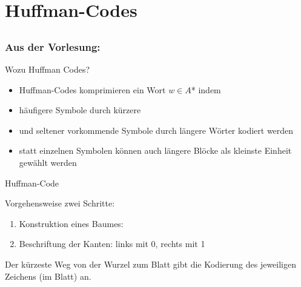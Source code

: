 \section{Huffman-Codes}
\subsection*{}
\begin{frame}
	\frametitle{Aus der Vorlesung:}
	\begin{block}{Wozu Huffman Codes?}
    		\begin{itemize}
              \item Huffman-Codes komprimieren ein Wort $w \in A$* indem \pause
              \item häufigere Symbole durch kürzere
              \item und seltener vorkommende Symbole durch längere Wörter
              kodiert werden \pause
              \item statt einzelnen Symbolen können auch längere Blöcke als
              kleinste Einheit gewählt werden
            \end{itemize}
    	\end{block}
\end{frame}

\begin{frame}{Huffman-Code}
	\begin{block}{Vorgehensweise}
		zwei Schritte:
    		\begin{enumerate}
			\item Konstruktion eines Baumes:
				\begin{itemize}
				\end{itemize}
			\item Beschriftung der Kanten: links mit 0, rechts mit 1
		\end{enumerate}
		Der kürzeste Weg von der Wurzel zum Blatt gibt die Kodierung des jeweiligen Zeichens (im Blatt) an.
    	\end{block}
\end{frame}

